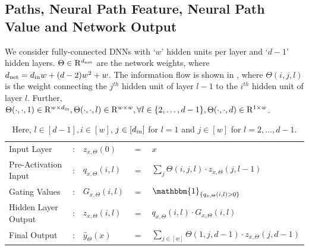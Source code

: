 \documentclass{article}
\begin{document}
\subsection{Paths, Neural Path Feature, Neural Path Value and Network Output}
We consider fully-connected DNNs with `$w$' hidden units per layer and `$d-1$' hidden layers. $\Theta\in\mathrm{R}^{d_{\text{net}}}$ are the network weights, where $d_{\text{net}}=d_{\text{in}} w+(d-2)w^2+w$. The information flow is shown in , where
$\Theta(i,j,l)$ is the weight connecting the $j^{th}$ hidden unit of layer $l-1$ to the $i^{th}$ hidden unit of layer $l$. Further, $\Theta(\cdot,\cdot,1)\in\mathrm{R}^{w\times d_{\text{in}}}, \Theta(\cdot,\cdot,l)\in\mathrm{R}^{w\times w},\forall l\in\{2,\ldots,d-1\}, \Theta(\cdot,\cdot,d)\in\mathrm{R}^{1\times w}$.
\begin{table}[h]
\centering
\begin{tabular}{|l l lll|}\hline
Input Layer&: &$z_{x,\Theta}(0)$ &$=$ &$x$ \\
Pre-Activation Input&: & $q_{x,\Theta}(i,l)$& $=$ & $\sum_{j} \Theta(i,j,l)\cdot z_{x,\Theta}(j,l-1)$\\
Gating Values&: &$G_{x,\Theta}(i,l)$& $=$ & $\mathbbm{1}_{\{q_{x,\Theta}(i,l)>0\}}$\\
Hidden Layer Output&: &$z_{x,\Theta}(i,l)$ & $=$ & $q_{x,\Theta}(i,l)\cdot G_{x,\Theta}(i,l)$ \\
Final Output&: & $\hat{y}_{\Theta}(x)$ & $=$ & $\sum_{j\in[w]} \Theta(1,j,d-1)\cdot z_{x,\Theta}(j,d-1)$\\\hline
\end{tabular}
\caption{Here, $l\in[d-1],i\in[w]$, $j\in[d_{\text{in}}]$ for $l=1$ and $j\in[w]$ for $l=2,\ldots,d-1$.} 
\label{tb:basic}
\end{table}
\end{document}
